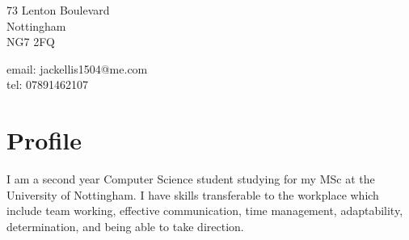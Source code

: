 \documentclass[12pt, a4paper]{article}
\begin{document}

\begin{minipage}[c]{.5\textwidth}
  \raggedright
  73 Lenton Boulevard\\
  Nottingham\\
  NG7 2FQ
\end{minipage}
\begin{minipage}[c]{.5\textwidth}
  \raggedleft
  email: jackellis1504@me.com\\
  tel: 07891462107
\end{minipage}

\vspace{5mm}

\section*{Profile}
I am a second year Computer Science student studying for my MSc at the University of Nottingham.
I have skills transferable to the workplace which include team working, effective communication, time management, adaptability, determination, and being able to take direction.
\end{document}
